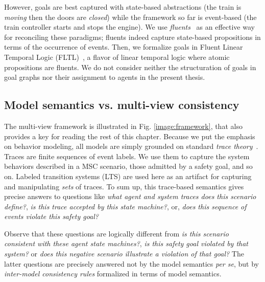 However, goals are best captured with state-based abstractions (the train is \emph{moving} then the doors are \emph{closed}) while the framework so far is event-based (the train controller starts and stops the engine). We use \emph{fluents}~\cite{Miller:2002} as an effective way for reconciling these paradigms; fluents indeed capture state-based propositions in terms of the occurrence of events. Then, we formalize goals in Fluent Linear Temporal Logic (FLTL)~\cite{Giannakopoulou:2003}, a flavor of linear temporal logic where atomic propositions are fluents. We do not consider neither the structuration of goals in goal graphs nor their assignment to agents in the present thesis.

\subsection{Model semantics vs. multi-view consistency}

The multi-view framework is illustrated in Fig. \ref{image:framework}, that also provides a key for reading the rest of this chapter. Because we put the emphasis on behavior modeling, all models are simply grounded on standard \emph{trace theory}~\cite{Hoare:1985}. Traces are finite sequences of event labels. We use them to capture the system behaviors described in a MSC scenario, those admitted by a safety goal, and so on. Labeled transition systems (LTS) are used here as an artifact for capturing and manipulating \emph{sets} of traces. To sum up, this trace-based semantics gives precise answers to questions like \emph{what agent and system traces does this scenario define?}, \emph{is this trace accepted by this state machine?}, or, \emph{does this sequence of events violate this safety goal?}

Observe that these questions are logically different from \emph{is this scenario consistent with these agent state machines?}, \emph{is this safety goal violated by that system?} or \emph{does this negative scenario illustrate a violation of that goal?} The latter questions are precisely answered not by the model semantics \emph{per se}, but by \emph{inter-model consistency rules} formalized in terms of model semantics. 

